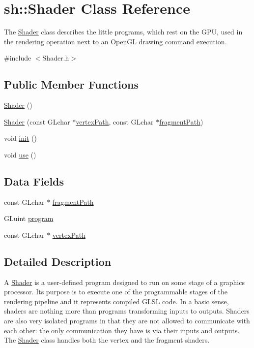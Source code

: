 \hypertarget{classsh_1_1Shader}{}\section{sh\+:\+:Shader Class Reference}
\label{classsh_1_1Shader}


The \hyperlink{classsh_1_1Shader}{Shader} class describes the little programs, which rest on the G\+PU, used in the rendering operation next to an Open\+GL drawing command execution.  




{\ttfamily \#include $<$Shader.\+h$>$}

\subsection*{Public Member Functions}
\begin{DoxyCompactItemize}
\item 
\hyperlink{classsh_1_1Shader_a838e67f15e8d0dd6e58844ef3dca25ab}{Shader} ()
\item 
\hyperlink{classsh_1_1Shader_a83bb368ad9001eb054d036a1991102dc}{Shader} (const G\+Lchar $\ast$\hyperlink{classsh_1_1Shader_ab895a8404ad72cdf2af7a596f47a1cd8}{vertex\+Path}, const G\+Lchar $\ast$\hyperlink{classsh_1_1Shader_a51f875ab763628c644a27bb4fce30bc9}{fragment\+Path})
\item 
void \hyperlink{classsh_1_1Shader_a4551228c3ee9186390295024c9a376d4}{init} ()
\item 
void \hyperlink{classsh_1_1Shader_a31480c10d6492f4b9ac3bf6cad347acf}{use} ()
\end{DoxyCompactItemize}
\subsection*{Data Fields}
\begin{DoxyCompactItemize}
\item 
const G\+Lchar $\ast$ \hyperlink{classsh_1_1Shader_a51f875ab763628c644a27bb4fce30bc9}{fragment\+Path}
\item 
G\+Luint \hyperlink{classsh_1_1Shader_a190d971a6a71eeeb9b186226d87000af}{program}
\item 
const G\+Lchar $\ast$ \hyperlink{classsh_1_1Shader_ab895a8404ad72cdf2af7a596f47a1cd8}{vertex\+Path}
\end{DoxyCompactItemize}


\subsection{Detailed Description}
A \hyperlink{classsh_1_1Shader}{Shader} is a user-\/defined program designed to run on some stage of a graphics processor. Its purpose is to execute one of the programmable stages of the rendering pipeline and it represents compiled G\+L\+SL code. In a basic sense, shaders are nothing more than programs transforming inputs to outputs. Shaders are also very isolated programs in that they are not allowed to communicate with each other\+: the only communication they have is via their inputs and outputs. The \hyperlink{classsh_1_1Shader}{Shader} class handles both the vertex and the fragment shaders. 

